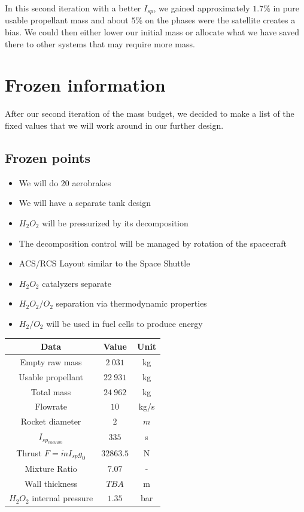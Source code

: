 In this second iteration with a better \(I_{sp}\), we gained
approximately \(1.7\)\% in pure usable propellant mass and about \(5\)\%
on the phases were the satellite creates a bias. We could then either
lower our initial mass or allocate what we have saved there to other
systems that may require more mass.\\

\newpage
\section{Frozen information}
After our second iteration of the mass budget, we decided to make a list of the fixed values that we will work around in our further design.
\subsection{Frozen points}
\begin{itemize}
	\item We will do $20$ aerobrakes
	\item We will have a separate tank design
	\item $H_2O_2$ will be pressurized by its decomposition
	\item The decomposition control will be managed by rotation of the spacecraft
	\item ACS/RCS Layout similar to the Space Shuttle
	\item $H_2O_2$ catalyzers separate
	\item $H_2O_2/O_2$ separation via thermodynamic properties
	\item $H_2/O_2$ will be used in fuel cells to produce energy
\end{itemize}
\begin{center}
	\begin{tabular}[H]{|c|c|c|}
		\hline
		\cellcolor{gray!50}Data & \cellcolor{gray!50}Value & \cellcolor{gray!50}Unit\\
		\hline
		Empty raw mass & $2\ 031$ & kg\\
		\hline
		Usable propellant & $22\ 931$ &kg\\
		\hline
		\cellcolor{green!50}Total mass & \cellcolor{green!50}$24\ 962$ & \cellcolor{green!50}kg\\
		\hline
		Flowrate & $10$ & kg/s\\
		\hline
		Rocket diameter & $2$ & $m$\\
		\hline
		$I_{sp_{vacuum}}$ & $335$ & s\\
		\hline
		Thrust $F=\dot m I_{sp} g_0$ & $32 863.5$ &N\\
		\hline
		Mixture Ratio & $7.07$ & -\\
		\hline
		Wall thickness & $TBA$ & m\\
		\hline
		$H_2O_2$ internal pressure & $1.35$ & bar\\
		\hline
	\end{tabular}
\end{center}
\newpage
